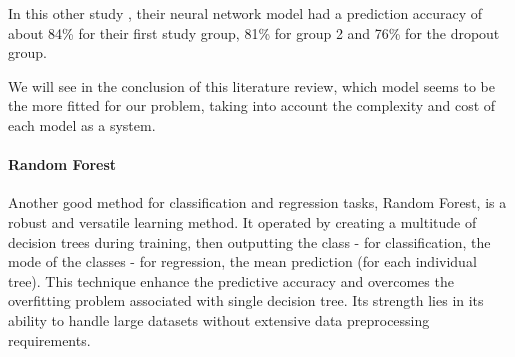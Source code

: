 \documentclass[conference]{IEEEtran}
\begin{document}
In this other study \cite{siri_predicting_2015}, their neural network model had a prediction accuracy of about 84\% for their first study group, 81\% for group 2 and 76\% for the dropout group. 

We will see in the conclusion of this literature review, which model seems to be the more fitted for our problem, taking into account the complexity and cost of each model as a system.
\vspace{8pt}


\paragraph{Random Forest}
Another good method for classification and regression tasks, Random Forest, is a robust and versatile learning method. It operated by creating a multitude of decision trees during training, then outputting the class - for classification, the mode of the classes - for regression, the mean prediction (for each individual tree).
This technique enhance the predictive accuracy and overcomes the overfitting problem associated with single decision tree.
Its strength lies in its ability to handle large datasets without extensive data preprocessing requirements. 
\end{document}
